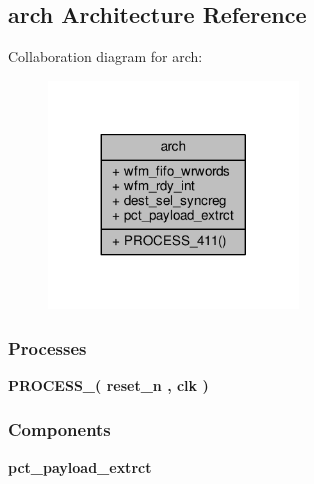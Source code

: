 \subsection{arch Architecture Reference}
\label{classstream__switch_1_1arch}


Collaboration diagram for arch\+:\nopagebreak
\begin{figure}[H]
\begin{center}
\leavevmode
\includegraphics[width=188pt]{d2/dea/classstream__switch_1_1arch__coll__graph}
\end{center}
\end{figure}
\subsubsection*{Processes}
 \begin{DoxyCompactItemize}
\item 
{\bf P\+R\+O\+C\+E\+S\+S\+\_}{\bfseries  ( {\bfseries {\bfseries {\bf reset\+\_\+n}} \textcolor{vhdlchar}{ }} , {\bfseries {\bfseries {\bf clk}} \textcolor{vhdlchar}{ }} )}
\end{DoxyCompactItemize}
\subsubsection*{Components}
 \begin{DoxyCompactItemize}
\item 
{\bf pct\+\_\+payload\+\_\+extrct}  {\bfseries }  
\end{DoxyCompactItemize}
